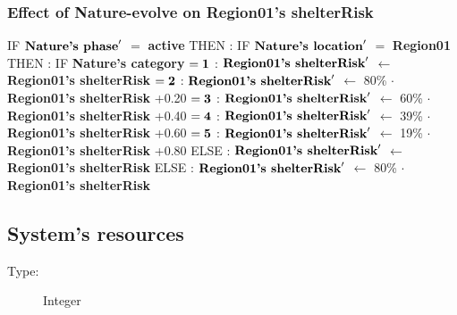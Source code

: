 \documentclass{article}%
\begin{document}
\subsubsection{Effect of Nature{-}evolve on Region01's shelterRisk}%
\label{ssubsec:Effect of Nature{-}evolve on Region01's shelterRisk}%
\begin{flushleft}%
IF %
$\mbox{\textbf{Nature's phase}} '$%
$=$%
\textbf{active}%
\linebreak%
\hspace*{2em}%
THEN %
: %
IF %
$\mbox{\textbf{Nature's location}} '$%
$=$%
\textbf{Region01}%
\linebreak%
\hspace*{4em}%
THEN %
: %
IF %
\textbf{Nature's category}%
\linebreak%
\hspace*{6em}%
$= \mbox{\textbf{1}}$%
: %
$\mbox{\textbf{Region01's shelterRisk}} '$%
$\leftarrow$%
\textbf{Region01's shelterRisk}%
\linebreak%
\hspace*{6em}%
$= \mbox{\textbf{2}}$%
: %
$\mbox{\textbf{Region01's shelterRisk}} '$%
$\leftarrow$%
80\%%
$\cdot$%
\textbf{Region01's shelterRisk}%
+0.20%
\linebreak%
\hspace*{6em}%
$= \mbox{\textbf{3}}$%
: %
$\mbox{\textbf{Region01's shelterRisk}} '$%
$\leftarrow$%
60\%%
$\cdot$%
\textbf{Region01's shelterRisk}%
+0.40%
\linebreak%
\hspace*{6em}%
$= \mbox{\textbf{4}}$%
: %
$\mbox{\textbf{Region01's shelterRisk}} '$%
$\leftarrow$%
39\%%
$\cdot$%
\textbf{Region01's shelterRisk}%
+0.60%
\linebreak%
\hspace*{6em}%
$= \mbox{\textbf{5}}$%
: %
$\mbox{\textbf{Region01's shelterRisk}} '$%
$\leftarrow$%
19\%%
$\cdot$%
\textbf{Region01's shelterRisk}%
+0.80%
\linebreak%
\hspace*{4em}%
ELSE %
: %
$\mbox{\textbf{Region01's shelterRisk}} '$%
$\leftarrow$%
\textbf{Region01's shelterRisk}%
\linebreak%
\hspace*{2em}%
ELSE %
: %
$\mbox{\textbf{Region01's shelterRisk}} '$%
$\leftarrow$%
80\%%
$\cdot$%
\textbf{Region01's shelterRisk}%
\end{flushleft}

%
\subsection{System's resources}%
\label{subsec:System's resources}%
\begin{description}%
\item[Type:]%
Integer%
\end{description}%
\end{document}
